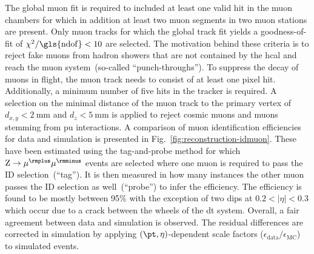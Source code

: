 The global muon fit is required to included at least one valid hit in the muon chambers for which in addition at least two muon segments in two muon stations are present. Only muon tracks for which the global track fit yields a goodness-of-fit of $\chi^2/\mathrm{\gls{ndof}}<10$ are selected. The motivation behind these criteria is to reject fake muons from hadron showers that are not contained by the \gls{hcal} and reach the muon system~(so-called ``punch-throughs''). To suppress the decay of muons in flight, the muon track needs to consist of at least one pixel hit. Additionally, a minimum number of five hits in the tracker is required. A selection on the minimal distance of the muon track to the primary vertex of $d_{x,y}<2~\mathrm{mm}$ and $d_{z}<5~\mathrm{mm}$ is applied to reject cosmic muons and muons stemming from \gls{pu} interactions. A comparison of muon identification efficiencies for data and simulation is presented in Fig.~\ref{fig:reconstruction-idmuon}. These have been estimated using the tag-and-probe method for which $\mathrm{Z}\to\mu^{\rmplus}\mu^{\rmminus}$ events are selected where one muon is required to pass the ID selection~(``tag''). It is then measured in how many instances the other muon passes the ID selection as well~(``probe'') to infer the efficiency. The efficiency is found to be mostly between 95\% with the exception of two dips at $0.2<|\eta|<0.3$ which occur due to a crack between the wheels of the \gls{dt} system. Overall, a fair agreement between data and simulation is observed. The residual differences are corrected in simulation by applying $(\pt,\eta)$-dependent scale factors ($\epsilon_\mathrm{data}/\epsilon_\mathrm{MC}$) to simulated events.

